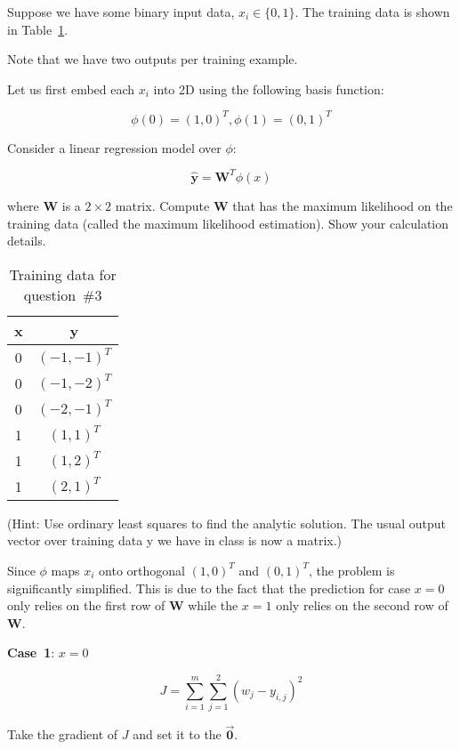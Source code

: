 \begin{problem}
  Suppose we have some binary input data, ${x_i \in \{0, 1\}}$. The training data is shown in Table~\ref{tab:P03:TrainingData}.


\noindent
Note that we have two outputs per training example.

Let us first embed each $x_i$ into 2D using the following basis function:

\[\phi(0) = (1, 0)^{T}, \phi(1) = (0, 1)^{T} \]

Consider a linear regression model over $\phi$:

\[\hat{\mathbf{y}} = \mathbf{W}^{T} \phi(x) \]

\noindent
where $\mathbf{W}$ is a $2\times2$ matrix. Compute $\mathbf{W}$ that has the maximum likelihood on the training data (called the maximum likelihood estimation). Show your calculation details.

\begin{table}[h]
  \centering
  \caption{Training data for question~\#3}\label{tab:P03:TrainingData}
  \begin{tabular}{c|c}
    x & y \\\hline
    0 & $(-1, -1)^{T}$\\
    0 & $(-1, -2)^{T}$\\
    0 & $(-2, -1)^{T}$\\
    1 & $(1, 1)^{T}$\\
    1 & $(1, 2)^{T}$\\
    1 & $(2, 1)^{T}$\\
  \end{tabular}
\end{table}

(Hint: \textnormal{Use ordinary least squares to find the analytic solution. The usual output vector over training data y we have in class is now a matrix.})
\end{problem}

Since $\phi$ maps $x_i$ onto orthogonal $(1,0)^{T}$ and $(0,1)^{T}$, the problem is significantly simplified.  This is due to the fact that the prediction for case $x=0$ only relies on the first row of $\mathbf{W}$ while the $x=1$ only relies on the second row of $\mathbf{W}$.

\noindent
\textbf{Case~1}: $x=0$

\[ J = \sum_{i=1}^{m} \sum_{j=1}^{2} \left(w_{j} - y_{i,j}\right)^2 \]

\noindent
Take the gradient of $J$ and set it to the $\vec{\mathbf{0}}$.

